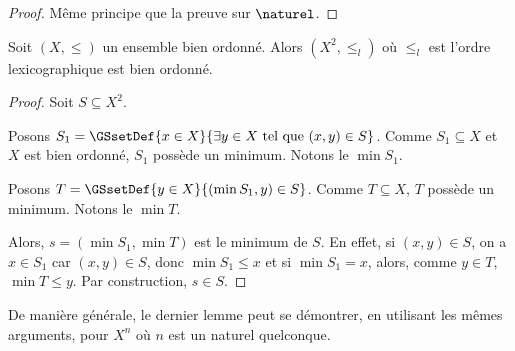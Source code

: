 \begin{proof}
  Même principe que la preuve sur $\naturel$.
\end{proof}

\begin{lemma}
  Soit $(X, \leq)$ un ensemble bien ordonné. Alors $(X^{2}, \leq_{l})$ où
  $\leq_{l}$ est l'ordre lexicographique est bien ordonné.
\end{lemma}

\begin{proof}
  Soit $S \subseteq X^{2}$.

  Posons $S_{1} = \GSsetDef{x \in X}{\exists y \in X \text{ tel que } (x, y) \in S}$.
  Comme $S_{1} \subseteq X$ et $X$ est bien ordonné, $S_{1}$ possède un minimum.
  Notons le $\min{S_{1}}$.

  Posons $T = \GSsetDef{y \in X}{(\min{S_{1}}, y) \in S}$. Comme $T \subseteq
  X$, $T$ possède un minimum. Notons le $\min{T}$.

  Alors, $s = (\min{S_{1}}, \min{T})$ est le minimum de $S$. En effet, si $(x, y)
  \in S$, on a $x \in S_{1}$ car $(x, y) \in S$, donc $\min{S_{1}} \leq x$ et si
  $\min{S_{1}} = x$, alors, comme $y \in T$, $\min{T} \leq y$. Par construction,
  $s \in S$.
\end{proof}

De manière générale, le dernier lemme peut se démontrer, en utilisant les mêmes
arguments, pour $X^{n}$ où $n$ est un naturel quelconque.